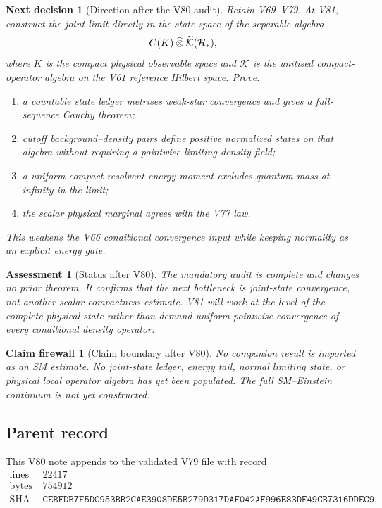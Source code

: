 \documentclass[11pt]{article}
\newtheorem{firewall}[theorem]{Claim firewall}
\newtheorem{decision}[theorem]{Next decision}
\newtheorem{assessment}[theorem]{Assessment}
\theoremstyle{remark}
\begin{document}
\begin{decision}[Direction after the V80 audit]
\label{dec:v12v80-next}
Retain V69--V79.  At V81, construct the joint limit directly in the
state space of the separable algebra
\[
 C(K)\mathbin{\widehat\otimes}
 \widetilde{\mathcal K}({\cal H}_*),
\]
where \(K\) is the compact physical observable space and
\(\widetilde{\mathcal K}\) is the unitised compact-operator algebra
on the V61 reference Hilbert space.  Prove:
\begin{enumerate}
\item a countable state ledger metrises weak-star convergence and
      gives a full-sequence Cauchy theorem;
\item cutoff background--density pairs define positive normalized
      states on that algebra without requiring a pointwise limiting
      density field;
\item a uniform compact-resolvent energy moment excludes quantum mass
      at infinity in the limit;
\item the scalar physical marginal agrees with the V77 law.
\end{enumerate}
This weakens the V66 conditional convergence input while keeping
normality as an explicit energy gate.
\end{decision}

\begin{assessment}[Status after V80]
\label{ass:v12v80-status}
The mandatory audit is complete and changes no prior theorem.  It
confirms that the next bottleneck is joint-state convergence, not
another scalar compactness estimate.  V81 will work at the level of
the complete physical state rather than demand uniform pointwise
convergence of every conditional density operator.
\end{assessment}

\begin{firewall}[Claim boundary after V80]
\label{fire:v12v80-claim}
No companion result is imported as an SM estimate.  No joint-state
ledger, energy tail, normal limiting state, or physical local
operator algebra has yet been populated.  The full SM--Einstein
continuum is not yet constructed.
\end{firewall}

\subsection{Parent record}

This V80 note appends to the validated V79 file with record
\[
\begin{array}{c|c}
\text{lines}&22417\\
\text{bytes}&754912\\
\text{SHA--256}&
\texttt{CEBFDB7F5DC953BB2CAE3908DE5B279D317DAF042AF996E83DF49CB7316DDEC9}.
\end{array}
\]
\end{document}
